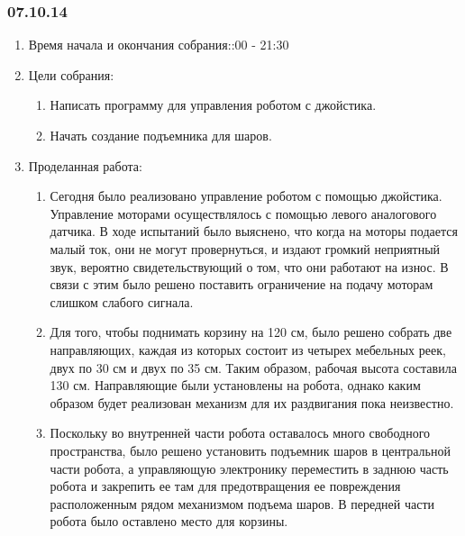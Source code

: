 
\subsubsection{07.10.14}

\begin{enumerate}
	\item Время начала и окончания собрания::00 - 21:30
	\item Цели собрания:\newline
	\begin{enumerate}
	  \item Написать программу для управления роботом с джойстика.\newline
	  
	  \item Начать создание подъемника для шаров.\newline
	  
    \end{enumerate}
	\item Проделанная работа:\newline
	\begin{enumerate}
	  \item Сегодня было реализовано управление роботом с помощью джойстика. Управление моторами осуществлялось с помощью левого аналогового датчика. В ходе испытаний было выяснено, что когда на моторы подается малый ток, они не могут провернуться, и издают громкий неприятный звук, вероятно свидетельствующий о том, что они работают на износ. В связи с этим было решено поставить ограничение на подачу моторам слишком слабого сигнала.\newline
      
      \item  Для того, чтобы поднимать корзину на 120 см, было решено собрать две направляющих, каждая из которых состоит из четырех мебельных реек, двух по 30 см и двух по 35 см. Таким образом, рабочая высота составила 130 см. Направляющие были установлены на робота, однако каким образом будет реализован механизм для их раздвигания пока неизвестно.\newline
      
      \item Поскольку во внутренней части робота оставалось много свободного пространства, было решено установить подъемник шаров в центральной части робота, а управляющую электронику переместить в заднюю часть робота и закрепить ее там для предотвращения ее повреждения расположенным рядом механизмом подъема шаров. В передней части робота было оставлено место для корзины. \newline
       

\end{enumerate}
\end{enumerate}
